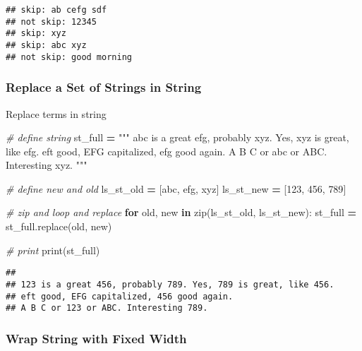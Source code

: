 \documentclass[
]{book}
\newenvironment{Shaded}{\begin{snugshade}}{\end{snugshade}}
\newcommand{\BuiltInTok}[1]{#1}
\newcommand{\CommentTok}[1]{\textcolor[rgb]{0.56,0.35,0.01}{\textit{#1}}}
\newcommand{\ControlFlowTok}[1]{\textcolor[rgb]{0.13,0.29,0.53}{\textbf{#1}}}
\newcommand{\KeywordTok}[1]{\textcolor[rgb]{0.13,0.29,0.53}{\textbf{#1}}}
\newcommand{\NormalTok}[1]{#1}
\newcommand{\OperatorTok}[1]{\textcolor[rgb]{0.81,0.36,0.00}{\textbf{#1}}}
\newcommand{\StringTok}[1]{\textcolor[rgb]{0.31,0.60,0.02}{#1}}
\begin{document}
\begin{verbatim}
## skip: ab cefg sdf
## not skip: 12345
## skip: xyz
## skip: abc xyz
## not skip: good morning
\end{verbatim}

\hypertarget{replace-a-set-of-strings-in-string}{%
\subsubsection{Replace a Set of Strings in String}\label{replace-a-set-of-strings-in-string}}

Replace terms in string

\begin{Shaded}
\begin{Highlighting}[]
\CommentTok{\# define string}
\NormalTok{st\_full }\OperatorTok{=} \StringTok{"""}
\StringTok{abc is a great efg, probably xyz. Yes, xyz is great, like efg. }
\StringTok{eft good, EFG capitalized, efg good again. }
\StringTok{A B C or abc or ABC. Interesting xyz. }
\StringTok{"""}

\CommentTok{\# define new and old}
\NormalTok{ls\_st\_old }\OperatorTok{=}\NormalTok{ [}\StringTok{\textquotesingle{}abc\textquotesingle{}}\NormalTok{, }\StringTok{\textquotesingle{}efg\textquotesingle{}}\NormalTok{, }\StringTok{\textquotesingle{}xyz\textquotesingle{}}\NormalTok{]}
\NormalTok{ls\_st\_new }\OperatorTok{=}\NormalTok{ [}\StringTok{\textquotesingle{}123\textquotesingle{}}\NormalTok{, }\StringTok{\textquotesingle{}456\textquotesingle{}}\NormalTok{, }\StringTok{\textquotesingle{}789\textquotesingle{}}\NormalTok{]}

\CommentTok{\# zip and loop and replace}
\ControlFlowTok{for}\NormalTok{ old, new }\KeywordTok{in} \BuiltInTok{zip}\NormalTok{(ls\_st\_old, ls\_st\_new):}
\NormalTok{  st\_full }\OperatorTok{=}\NormalTok{ st\_full.replace(old, new)}

\CommentTok{\# print}
\BuiltInTok{print}\NormalTok{(st\_full)}
\end{Highlighting}
\end{Shaded}

\begin{verbatim}
## 
## 123 is a great 456, probably 789. Yes, 789 is great, like 456. 
## eft good, EFG capitalized, 456 good again. 
## A B C or 123 or ABC. Interesting 789.
\end{verbatim}

\hypertarget{wrap-string-with-fixed-width}{%
\subsubsection{Wrap String with Fixed Width}\label{wrap-string-with-fixed-width}}
\end{document}
